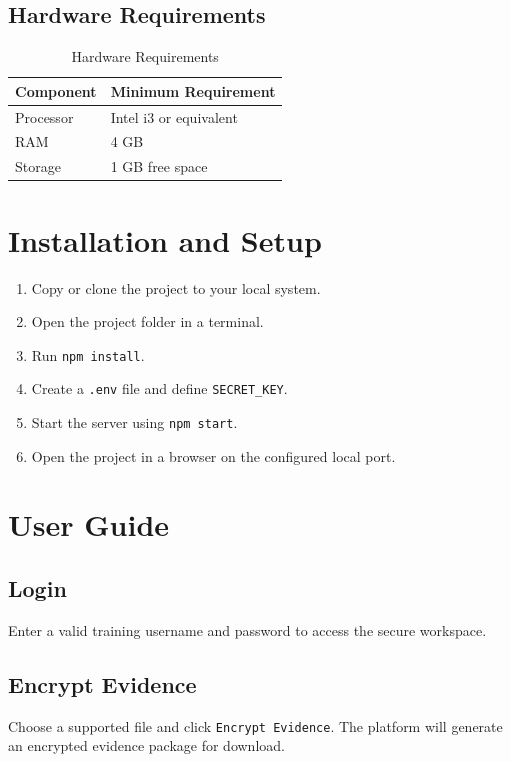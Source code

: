 \documentclass[12pt,a4paper]{report}
\begin{document}
\subsection{Hardware Requirements}

\begin{table}[h!]
\centering
\begin{tabular}{ll}
\toprule
\textbf{Component} & \textbf{Minimum Requirement} \\
\midrule
Processor & Intel i3 or equivalent \\
RAM & 4 GB \\
Storage & 1 GB free space \\
\bottomrule
\end{tabular}
\caption{Hardware Requirements}
\end{table}

\section{Installation and Setup}
\begin{enumerate}
\item Copy or clone the project to your local system.
\item Open the project folder in a terminal.
\item Run \texttt{npm install}.
\item Create a \texttt{.env} file and define \texttt{SECRET\_KEY}.
\item Start the server using \texttt{npm start}.
\item Open the project in a browser on the configured local port.
\end{enumerate}

\section{User Guide}
\subsection{Login}
Enter a valid training username and password to access the secure workspace.

\subsection{Encrypt Evidence}
Choose a supported file and click \texttt{Encrypt Evidence}. The platform will generate an encrypted evidence package for download.
\end{document}
